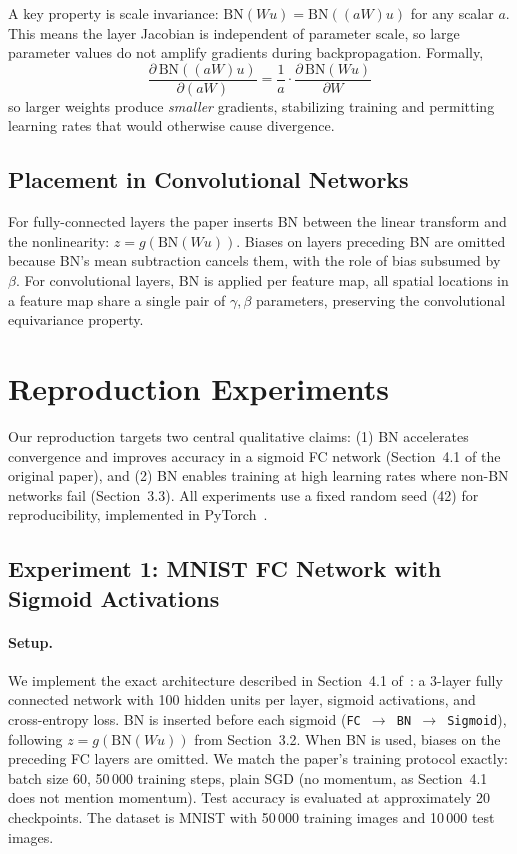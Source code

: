 \documentclass{article}
\begin{document}
A key property is scale invariance: $\mathrm{BN}(Wu) = \mathrm{BN}((aW)u)$ for any scalar $a$.
This means the layer Jacobian is independent of parameter scale, so large parameter values do not
amplify gradients during backpropagation. Formally,
\[
  \frac{\partial\,\mathrm{BN}((aW)u)}{\partial(aW)} = \frac{1}{a} \cdot \frac{\partial\,\mathrm{BN}(Wu)}{\partial W}
\]
so larger weights produce \emph{smaller} gradients, stabilizing training and permitting learning
rates that would otherwise cause divergence.

\subsection{Placement in Convolutional Networks}

For fully-connected layers the paper inserts BN between the linear transform and the
nonlinearity: $z = g(\mathrm{BN}(Wu))$. Biases on layers preceding BN are omitted because
BN's mean subtraction cancels them, with the role of bias subsumed by $\beta$. For
convolutional layers, BN is applied per feature map, all spatial locations in a feature map
share a single pair of $\gamma, \beta$ parameters, preserving the convolutional equivariance
property.


\section{Reproduction Experiments}

Our reproduction targets two central qualitative claims: (1) BN accelerates convergence and
improves accuracy in a sigmoid FC network (Section~4.1 of the original paper), and (2) BN
enables training at high learning rates where non-BN networks fail (Section~3.3). All
experiments use a fixed random seed (42) for reproducibility, implemented in PyTorch~\cite{paszke2019pytorch}.

\subsection{Experiment 1: MNIST FC Network with Sigmoid Activations}

\paragraph{Setup.}
We implement the exact architecture described in Section~4.1 of~\cite{ioffe2015batch}: a
3-layer fully connected network with 100 hidden units per layer, sigmoid activations, and
cross-entropy loss. BN is inserted before each sigmoid (\texttt{FC $\to$ BN $\to$ Sigmoid}),
following $z = g(\mathrm{BN}(Wu))$ from Section~3.2. When BN is used, biases on the preceding
FC layers are omitted. We match the paper's training protocol exactly: batch size 60, 50\,000
training steps, plain SGD (no momentum, as Section~4.1 does not mention momentum). Test
accuracy is evaluated at approximately 20 checkpoints. The dataset is MNIST with 50\,000
training images and 10\,000 test images.
\end{document}
